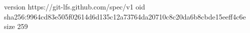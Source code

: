 version https://git-lfs.github.com/spec/v1
oid sha256:9964cd83e505f02614d6d135c12a73764da20710c8c20da6b8cbde15eeff4c6e
size 259
